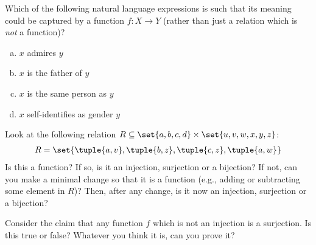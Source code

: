 \documentclass[nobib,nofonts]{tufte-handout}
\begin{document}

\bigskip
\noindent \colorbox{mygray}{\centering
  \begin{minipage}{1.0\textwidth}

    \begin{exercise}
      Which of the following natural language expressions is such that its meaning could be
      captured by a function $f \colon X \rightarrow Y$ (rather than just a relation which is \emph{not} a function)?
      \begin{multicols}{2}
      \begin{enumerate}[a.]
        \item $x$ admires $y$
        \item $x$ is the father of $y$
        \item $x$ is the same person as $y$
        \item $x$ self-identifies as gender $y$
      \end{enumerate}
    \end{multicols}
    \end{exercise}

    \begin{exercise}
      Look at the following relation $R \subseteq \set{a,b,c,d} \times \set{u,v,w,x,y,z}$:
      \begin{align*}
        R = \set{
        \tuple{a,v},
        \tuple{b,z},
        \tuple{c,z},
        \tuple{a,w}
        }
      \end{align*}
      Is this a function? If so, is it an injection, surjection or a bijection? If not, can you make a minimal change so that it is a function (e.g., adding or subtracting some element in $R$)? Then, after any change, is it now an injection, surjection or a bijection?
    \end{exercise}

    \begin{exercise}
      Consider the claim that any function $f$ which is not an injection is a surjection. Is this true or false? Whatever you think it is, can you prove it?
    \end{exercise}
  \end{minipage}
}
\end{document}
